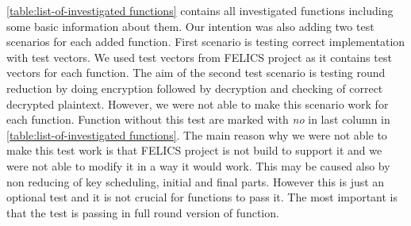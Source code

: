 \documentclass[
    digital,    %
    oneside,    %
    color,
    11pt,
    nocover,
    notable,
    nolof,
    nolot,
    final
]{fithesis3}
\begin{document}
\cref{table:list-of-investigated functions} contains all investigated functions including some basic information about them. Our intention was also adding two test scenarios for each added function. First scenario is testing correct implementation with test vectors. We used test vectors from FELICS project as it contains test vectors for each function. The aim of the second test scenario is testing round reduction by doing encryption followed by decryption and checking of correct decrypted plaintext. However, we were not able to make this scenario work for each function. Function without this test are marked with \textit{no} in last column in \cref{table:list-of-investigated functions}. The main reason why we were not able to make this test work is that FELICS project is not build to support it and we were not able to modify it in a way it would work. This may be caused also by non reducing of key scheduling, initial and final parts. However this is just an optional test and it is not crucial for functions to pass it. The most important is that the test is passing in full round version of function.
\end{document}
